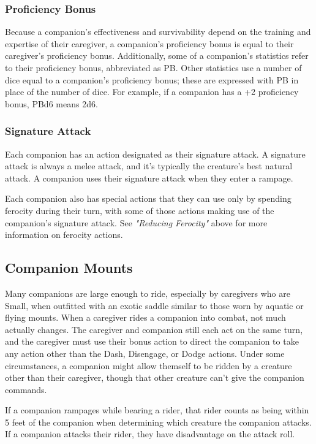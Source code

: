 \documentclass[10pt,a4paper,twoside,bg=print,twocolumn,openany,nodeprecatedcode]{dndbook}
\begin{document}
\subsubsection{Proficiency Bonus}
Because a companion's effectiveness and survivability depend on the training and expertise of their caregiver, a companion's proficiency bonus is equal to their caregiver's proficiency bonus. Additionally, some of a companion's statistics refer to their proficiency bonus, abbreviated as PB. Other statistics use a number of dice equal to a companion's proficiency bonus; these are expressed with PB in place of the number of dice. For example, if a companion has a +2 proficiency bonus, PBd6 means 2d6.

\subsubsection{Signature Attack}
Each companion has an action designated as their signature attack. A signature attack is always a melee attack, and it's typically the creature's best natural attack. A companion uses their signature attack when they enter a rampage.

Each companion also has special actions that they can use only by spending ferocity during their turn, with some of those actions making use of the companion's signature attack. See \textit{"Reducing Ferocity"} above for more information on ferocity actions.

\subsection{Companion Mounts}
Many companions are large enough to ride, especially by caregivers who are Small, when outfitted with an exotic saddle similar to those worn by aquatic or flying mounts. When a caregiver rides a companion into combat, not much actually changes. The caregiver and companion still each act on the same turn, and the caregiver must use their bonus action to direct the companion to take any action other than the Dash, Disengage, or Dodge actions. Under some circumstances, a companion might allow themself to be ridden by a creature other than their caregiver, though that other creature can't give the companion commands.

If a companion rampages while bearing a rider, that rider counts as being within 5 feet of the companion when determining which creature the companion attacks. If a companion attacks their rider, they have disadvantage on the attack roll.
\end{document}
